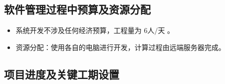 \documentclass[
  hyperref, a4paper]{ctexart}
\providecommand{\tightlist}{%
  \setlength{\itemsep}{0pt}\setlength{\parskip}{0pt}}
\begin{document}
\hypertarget{ux8f6fux4ef6ux7ba1ux7406ux8fc7ux7a0bux4e2dux9884ux7b97ux53caux8d44ux6e90ux5206ux914d}{%
\subsection{软件管理过程中预算及资源分配}\label{ux8f6fux4ef6ux7ba1ux7406ux8fc7ux7a0bux4e2dux9884ux7b97ux53caux8d44ux6e90ux5206ux914d}}

\begin{itemize}
\tightlist
\item
  系统开发不涉及任何经济预算，工程量为 6人/天 。
\item
  资源分配：使用各自的电脑进行开发，计算过程由远端服务器完成。
\end{itemize}

\hypertarget{ux9879ux76eeux8fdbux5ea6ux53caux5173ux952eux5de5ux671fux8bbeux7f6e-1}{%
\subsection{项目进度及关键工期设置}\label{ux9879ux76eeux8fdbux5ea6ux53caux5173ux952eux5de5ux671fux8bbeux7f6e-1}}
\end{document}
